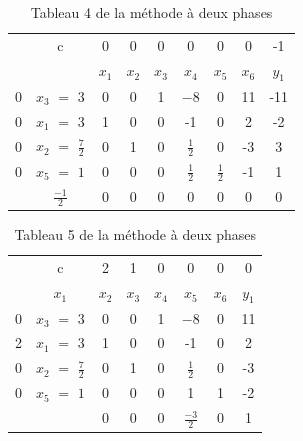 \begin{table}
\begin{tabular}{|c|c|c|c|c|c|c|c|c|}
	\hline
      & c & 0 & 0 & 0 & 0 & 0 & 0 & -1 \\ 
      \cline{2-9}
       &  & $x_{1}$ & $x_{2}$  & $x_{3}$  & $x_{4}$ & $x_{5}$ & $x_{6}$ & $y_{1}$ \\
       \hline
   0 & $x_{3}$  $=$ $3$ & 0 & 0 & 1 & $-8$ & $0$ & 11 & -11 \\
      \hline
	0 & $x_{1}$ $=$ 3 & 1 & 0 & 0 & -1 & 0 & 2 & -2 \\
	  \hline
	0 & $x_{2}$ $=$ $\frac{7}{2}$  & 0 & 1 & 0 & $\frac{1}{2}$ & 0 & -3 & 3\\
	  \hline
	0 & $x_{5}$ $=$ $1$  & 0 & 0 & 0 & $\frac{1}{2}$ & $\frac{1}{2}$ & -1 & 1\\
	  \hline
	 & $\frac{-1}{2}$ & 0 & 0 & 0 & 0 & 0 & 0 & 0\\
	  \hline
	\end{tabular}
\caption{Tableau 4 de la méthode à deux phases}
\end{table}
\begin{table}
\begin{tabular}{|c|c|c|c|c|c|c|c|}
	\hline
      & c & 2 & 1 & 0 & 0 & 0 & 0  \\ 
    \cline{2-9}
       & $x_{1}$ & $x_{2}$ & $x_{3}$  & $x_{4}$ & $x_{5}$ & $x_{6}$ & $y_{1}$ \\
       \hline
   0 & $x_{3}$  $=$ $3$ & 0 & 0 & 1 & $-8$ & $0$ & 11 \\
      \hline
	2 & $x_{1}$ $=$ 3 & 1 & 0 & 0 & -1 & 0 & 2  \\
	  \hline
	0 & $x_{2}$ $=$ $\frac{7}{2}$  & 0 & 1 & 0 & $\frac{1}{2}$ & 0 & -3 \\
	  \hline
	0 & $x_{5}$ $=$ $1$  & 0 & 0 & 0 & 1 & 1 & -2 \\
	  \hline
	 &  & 0 & 0 & 0 & $\frac{-3}{2}$ & 0 & 1 \\
	  \hline
	\end{tabular}
\caption {Tableau 5 de la méthode à deux phases}
\end{table}

